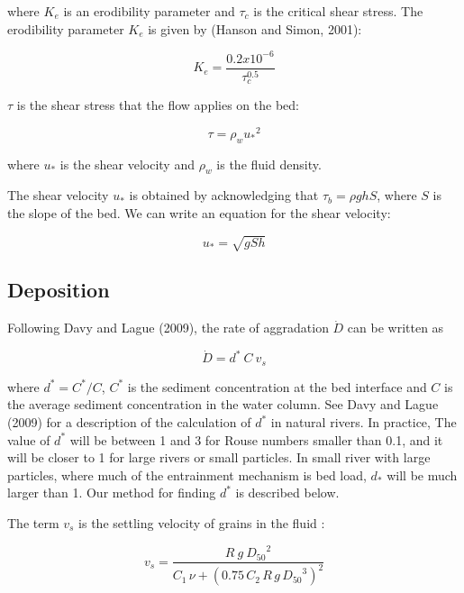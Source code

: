 \documentclass[11pt]{article}
\begin{document}
\noindent where $K_e$ is an erodibility parameter and ${\tau_c}$ is the critical shear stress. The erodibility parameter $K_e$ is given by (Hanson and Simon, 2001):
 
\begin{equation}
K_e = \frac{0.2 x 10^{-6}}{\tau_c^{0.5}}
\end{equation}

$\tau$ is the shear stress that the flow applies on the bed:

\begin{equation}
\tau = \rho_w {u_*}^2
\end{equation}

\noindent where $u_*$ is the shear velocity and $\rho_w$ is the fluid density.

The shear velocity $u_*$ is obtained by acknowledging that $\tau_b = \rho g h S$, where $S$ is the slope of the bed. We can write an equation for the shear velocity:

\begin{equation}
u_* = \sqrt{g S h}
\end{equation}

\subsection{Deposition}

Following Davy and Lague (2009), the rate of aggradation $\dot{D}$ can be written as

\begin{equation}
\dot{D} = d^* \: C \: v_s
\end{equation}

\noindent where $d^* = C^* / C$, $C^*$ is the sediment concentration at the bed interface and $C$ is the average sediment concentration in the water column. See Davy and Lague (2009) for a description of the calculation of $d^*$ in natural rivers. In practice, The value of $d^*$ will be between 1 and 3 for Rouse numbers smaller than 0.1, and it will be closer to 1 for large rivers or small particles. In small river with large particles, where much of the entrainment mechanism is bed load, $d_*$ will be much larger than 1. Our method for finding $d^*$ is described below.

The term $v_s$ is the settling velocity of grains in the fluid \citep{ferguson2004simple}:

\begin{equation}
v_s = \frac{R \: g \: {D_{50}}^2}{C_1 \, \nu + (0.75 \, C_2 \, R \, g \, {D_{50}}^3)^2}
\end{equation}
\end{document}
